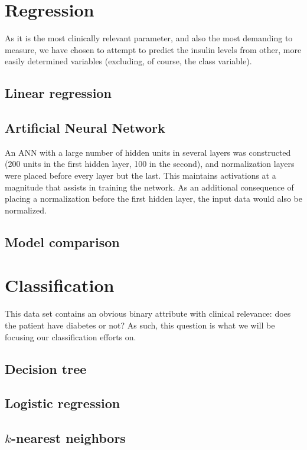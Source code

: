 \section{Regression}
As it is the most clinically relevant parameter,
and also the most demanding to measure,
we have chosen to attempt to predict the insulin levels
from other, more easily determined variables
(excluding, of course, the class variable).

\subsection{Linear regression}

\subsection{Artificial Neural Network}
An ANN with a large number of hidden units in several layers was constructed
(200 units in the first hidden layer, 100 in the second),
and normalization layers were placed before every layer but the last.
This maintains activations at a magnitude that assists in training the network.
As an additional consequence of placing a normalization before the first hidden layer,
the input data would also be normalized.

\subsection{Model comparison}


\section{Classification}

This data set contains an obvious binary attribute
with clinical relevance:
does the patient have diabetes or not?
As such, this question is what we will be
focusing our classification efforts on.

\subsection{Decision tree}

\subsection{Logistic regression}

\subsection{$k$-nearest neighbors}

